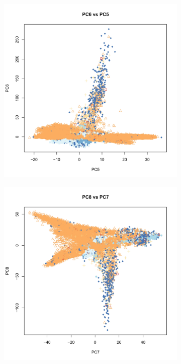 \documentclass[a4paper,12pt]{article}
\begin{document}
\begin{figure}[h]
\begin{subfigure}{.32\textwidth}
  \label{fig:sfig2}
\end{subfigure} 
\begin{subfigure}{.32\textwidth}
  \centering
  \includegraphics[width=\linewidth]{pca5_6.jpeg}
  \label{fig:sfig1}
\end{subfigure}
\begin{subfigure}{.32\textwidth}
  \centering
  \includegraphics[width=\linewidth]{pca7_8.jpeg}

\end{subfigure}
\end{figure}
\end{document}
